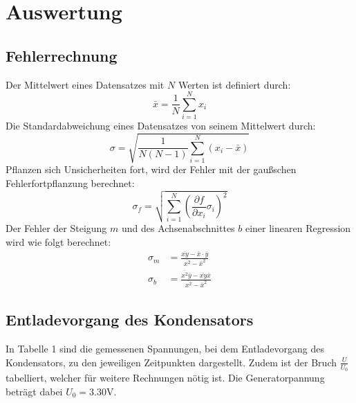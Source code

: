 \section{Auswertung}
\label{sec:Auswertung}

\subsection{Fehlerrechnung}
Der Mittelwert eines Datensatzes mit $N$ Werten ist definiert durch:
\begin{equation}
  \bar{x} = \frac{1}{N} \sum_{i=1}^N x_i
\end{equation}
Die Standardabweichung eines Datensatzes von seinem Mittelwert durch:
\begin{equation}
  \sigma = \sqrt{\frac{1}{N(N-1)} \sum_{i=1}^N (x_i - \bar{x})}
\end{equation}
Pflanzen sich Unsicherheiten fort, wird der Fehler mit der gaußschen
Fehlerfortpflanzung berechnet:
\begin{equation}
  \sigma_f = \sqrt{
      \sum\limits_{i = 1}^N
       \left( \frac{\partial f}{\partial x_i} \sigma_i \right)^{\!\! 2}
     }
\end{equation}
Der Fehler der Steigung $m$ und des Achsenabschnittes $b$ einer linearen Regression
wird wie folgt berechnet:
\begin{align}
  \sigma_m &= \frac{\overline{xy}-\bar{x}\cdot\bar{y}}{\bar{x^2}-\bar{x}^2} \\
  \sigma_b &= \frac{\bar{x^2}\bar{y}-\overline{xy}\bar{x}}{\bar{x^2}-\bar{x}^2}
\end{align}


\subsection{Entladevorgang des Kondensators}
In Tabelle 1 sind die gemessenen Spannungen, bei dem Entladevorgang des Kondensators, zu den jeweiligen Zeitpunkten dargestellt. Zudem
ist der Bruch $\frac{U}{U_0}$ tabelliert, welcher für weitere Rechnungen nötig ist. Die Generatorpannung beträgt
dabei $U_0 = 3.30$V.

